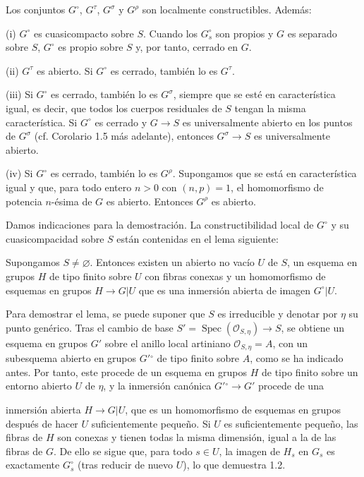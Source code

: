  Los conjuntos $G^\circ$, $G^\tau$, $G^\sigma$ y $G^\rho$
son localmente constructibles. Además:

\noindent (i) $G^\circ$ es cuasicompacto sobre $S$. Cuando los $G_s^\circ$ son
propios y $G$ es separado sobre $S$, $G^\circ$ es propio sobre $S$ y, por
tanto, cerrado en $G$.

\noindent (ii) $G^\tau$ es abierto. Si $G^\circ$ es cerrado, también lo es
$G^\tau$.

\noindent (iii) Si $G^\circ$ es cerrado, también lo es $G^\sigma$, siempre que
se esté en característica igual, es decir, que todos los cuerpos residuales de
$S$ tengan la misma característica. Si $G^\circ$ es cerrado y
$G\longrightarrow S$ es universalmente abierto en los puntos de $G^\sigma$
(cf. Corolario 1.5 más adelante), entonces $G^\sigma\longrightarrow S$ es
universalmente abierto.

\noindent (iv) Si $G^\circ$ es cerrado, también lo es $G^\rho$. Supongamos que
se está en característica igual y que, para todo entero $n>0$ con $(n,p)=1$,
el homomorfismo de potencia $n$-ésima de $G$ es abierto. Entonces $G^\rho$ es
abierto.

Damos indicaciones para la demostración. La constructibilidad local de
$G^\circ$ y su cuasicompacidad sobre $S$ están contenidas en el lema siguiente:

 Supongamos $S\neq\varnothing$. Entonces existen un abierto
no vacío $U$ de $S$, un esquema en grupos $H$ de tipo finito sobre $U$ con
fibras conexas y un homomorfismo de esquemas en grupos
$H\longrightarrow G|U$ que es una inmersión abierta de imagen $G^\circ|U$.

Para demostrar el lema, se puede suponer que $S$ es irreducible y denotar por
$\eta$ su punto genérico. Tras el cambio de base
$S'=\operatorname{Spec}(\mathcal O_{S,\eta})\longrightarrow S$, se obtiene un
esquema en grupos $G'$ sobre el anillo local artiniano
$\mathcal O_{S,\eta}=A$, con un subesquema abierto en grupos $G'{}^\circ$ de
tipo finito sobre $A$, como se ha indicado antes. Por tanto, este procede de un
esquema en grupos $H$ de tipo finito sobre un entorno abierto $U$ de $\eta$, y
la inmersión canónica $G'{}^\circ\longrightarrow G'$ procede de una

inmersión abierta $H\longrightarrow G|U$, que es un homomorfismo de esquemas en
grupos después de hacer $U$ suficientemente pequeño. Si $U$ es suficientemente
pequeño, las fibras de $H$ son conexas y tienen todas la misma dimensión,
igual a la de las fibras de $G$. De ello se sigue que, para todo $s\in U$, la
imagen de $H_s$ en $G_s$ es exactamente $G_s^\circ$ (tras reducir de nuevo
$U$), lo que demuestra 1.2.

